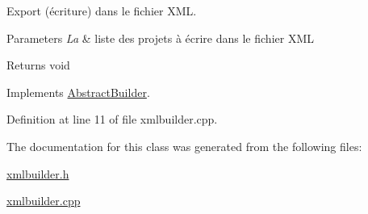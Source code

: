 Export (écriture) dans le fichier X\+M\+L. 


\begin{DoxyParams}{Parameters}
{\em La} & liste des projets à écrire dans le fichier X\+M\+L \\
\hline
\end{DoxyParams}
\begin{DoxyReturn}{Returns}
void 
\end{DoxyReturn}


Implements \hyperlink{class_abstract_builder_a6c2fe99038d2cba8aa7e30b58b0d0aca}{Abstract\+Builder}.



Definition at line 11 of file xmlbuilder.\+cpp.



The documentation for this class was generated from the following files\+:\begin{DoxyCompactItemize}
\item 
\hyperlink{xmlbuilder_8h}{xmlbuilder.\+h}\item 
\hyperlink{xmlbuilder_8cpp}{xmlbuilder.\+cpp}\end{DoxyCompactItemize}
